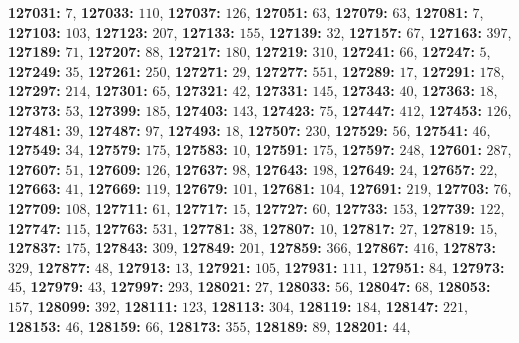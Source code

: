 \textsf{\bfseries 127031:} $7$, \textsf{\bfseries 127033:} $110$, \textsf{\bfseries 127037:} $126$, \textsf{\bfseries 127051:} $63$, \textsf{\bfseries 127079:} $63$, \textsf{\bfseries 127081:} $7$, \textsf{\bfseries 127103:} $103$, \textsf{\bfseries 127123:} $207$, \textsf{\bfseries 127133:} $155$, \textsf{\bfseries 127139:} $32$, \textsf{\bfseries 127157:} $67$, \textsf{\bfseries 127163:} $397$, \textsf{\bfseries 127189:} $71$, \textsf{\bfseries 127207:} $88$, \textsf{\bfseries 127217:} $180$, \textsf{\bfseries 127219:} $310$, \textsf{\bfseries 127241:} $66$, \textsf{\bfseries 127247:} $5$, \textsf{\bfseries 127249:} $35$, \textsf{\bfseries 127261:} $250$, \textsf{\bfseries 127271:} $29$, \textsf{\bfseries 127277:} $551$, \textsf{\bfseries 127289:} $17$, \textsf{\bfseries 127291:} $178$, \textsf{\bfseries 127297:} $214$, \textsf{\bfseries 127301:} $65$, \textsf{\bfseries 127321:} $42$, \textsf{\bfseries 127331:} $145$, \textsf{\bfseries 127343:} $40$, \textsf{\bfseries 127363:} $18$, \textsf{\bfseries 127373:} $53$, \textsf{\bfseries 127399:} $185$, \textsf{\bfseries 127403:} $143$, \textsf{\bfseries 127423:} $75$, \textsf{\bfseries 127447:} $412$, \textsf{\bfseries 127453:} $126$, \textsf{\bfseries 127481:} $39$, \textsf{\bfseries 127487:} $97$, \textsf{\bfseries 127493:} $18$, \textsf{\bfseries 127507:} $230$, \textsf{\bfseries 127529:} $56$, \textsf{\bfseries 127541:} $46$, \textsf{\bfseries 127549:} $34$, \textsf{\bfseries 127579:} $175$, \textsf{\bfseries 127583:} $10$, \textsf{\bfseries 127591:} $175$, \textsf{\bfseries 127597:} $248$, \textsf{\bfseries 127601:} $287$, \textsf{\bfseries 127607:} $51$, \textsf{\bfseries 127609:} $126$, \textsf{\bfseries 127637:} $98$, \textsf{\bfseries 127643:} $198$, \textsf{\bfseries 127649:} $24$, \textsf{\bfseries 127657:} $22$, \textsf{\bfseries 127663:} $41$, \textsf{\bfseries 127669:} $119$, \textsf{\bfseries 127679:} $101$, \textsf{\bfseries 127681:} $104$, \textsf{\bfseries 127691:} $219$, \textsf{\bfseries 127703:} $76$, \textsf{\bfseries 127709:} $108$, \textsf{\bfseries 127711:} $61$, \textsf{\bfseries 127717:} $15$, \textsf{\bfseries 127727:} $60$, \textsf{\bfseries 127733:} $153$, \textsf{\bfseries 127739:} $122$, \textsf{\bfseries 127747:} $115$, \textsf{\bfseries 127763:} $531$, \textsf{\bfseries 127781:} $38$, \textsf{\bfseries 127807:} $10$, \textsf{\bfseries 127817:} $27$, \textsf{\bfseries 127819:} $15$, \textsf{\bfseries 127837:} $175$, \textsf{\bfseries 127843:} $309$, \textsf{\bfseries 127849:} $201$, \textsf{\bfseries 127859:} $366$, \textsf{\bfseries 127867:} $416$, \textsf{\bfseries 127873:} $329$, \textsf{\bfseries 127877:} $48$, \textsf{\bfseries 127913:} $13$, \textsf{\bfseries 127921:} $105$, \textsf{\bfseries 127931:} $111$, \textsf{\bfseries 127951:} $84$, \textsf{\bfseries 127973:} $45$, \textsf{\bfseries 127979:} $43$, \textsf{\bfseries 127997:} $293$, \textsf{\bfseries 128021:} $27$, \textsf{\bfseries 128033:} $56$, \textsf{\bfseries 128047:} $68$, \textsf{\bfseries 128053:} $157$, \textsf{\bfseries 128099:} $392$, \textsf{\bfseries 128111:} $123$, \textsf{\bfseries 128113:} $304$, \textsf{\bfseries 128119:} $184$, \textsf{\bfseries 128147:} $221$, \textsf{\bfseries 128153:} $46$, \textsf{\bfseries 128159:} $66$, \textsf{\bfseries 128173:} $355$, \textsf{\bfseries 128189:} $89$, \textsf{\bfseries 128201:} $44$, 
